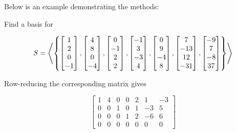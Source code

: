 \documentclass[a4paper,12pt]{article}
\begin{document}
Below is an example demonstrating the methods:\n

\begin{exm}
  Find a basis for

  $$S=\left\langle \left\{ \begin{bmatrix}
    1\\
    2\\
    0\\
    -1
  \end{bmatrix},\begin{bmatrix}
    4\\
    8\\
    0\\
    -4
  \end{bmatrix},\begin{bmatrix}
    0\\
    -1\\
    2\\
    2
  \end{bmatrix},\begin{bmatrix}
    -1\\
    3\\
    -3\\
    4
  \end{bmatrix},\begin{bmatrix}
    0\\
    9\\
    -4\\
    8
  \end{bmatrix},\begin{bmatrix}
    7\\
    -13\\
    12\\
    -31
  \end{bmatrix},\begin{bmatrix}
    -9\\
    7\\
    -8\\
    37
  \end{bmatrix}\right\}\right\rangle$$\s

  \ans{} Row-reducing the corresponding matrix gives

  $$\begin{bmatrix}
    1 & 4 & 0 & 0 & 2 & 1 & -3\\
    0 & 0 & 1 & 0 & 1 & -3 & 5\\
    0 & 0 & 0 & 1 & 2 & -6 & 6\\
    0 & 0 & 0 & 0 & 0 & 0 & 0
  \end{bmatrix}$$\s


\end{exm}
\end{document}
